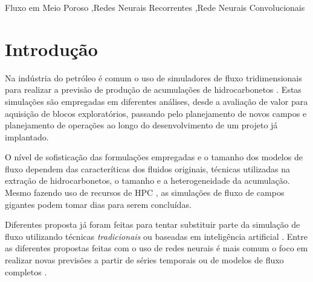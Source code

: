 \documentclass[final,5p]{elsarticle}
\numberwithin{equation}{section}
\begin{document}
\begin{frontmatter}

\begin{keyword}
    Fluxo em Meio Poroso \sep Redes Neurais Recorrentes \sep Rede Neurais Convolucionais



\end{keyword}

\end{frontmatter}

\section{Introdução}

    Na indústria do petróleo é comum o uso de simuladores de fluxo tridimensionais para realizar a previsão de produção de acumulações de hidrocarbonetos \cite{rosa2006engenharia,dake1983fundamentals}. Estas simulações são empregadas em diferentes análises, desde a avaliação de valor para aquisição de blocos exploratórios, passando pelo planejamento de novos campos e planejamento de operações ao longo do desenvolvimento de um projeto já implantado.

    O nível de sofisticação das formulações empregadas e o tamanho dos modelos de fluxo dependem das caracteríticas dos fluidos originais, técnicas utilizadas na extração de hidrocarbonetos, o tamanho e a heterogeneidade da acumulação. Mesmo fazendo uso de recursos de HPC \cite{10.2118/149132-MS}, as simulações de fluxo de campos gigantes podem tomar dias para serem concluídas.

    Diferentes proposta já foram feitas para tentar substituir parte da simulação de fluxo utilizando técnicas \emph{tradicionais} \cite{amorim2012risk} ou baseadas em inteligência artificial \cite{ertekin2019artificial}. Entre as diferentes propostas feitas com o uso de redes neurais é mais comum o foco em realizar novas previsões a partir de séries temporais \cite{de2022data, davtyan2020oil, kim2021recurrent} ou de modelos de fluxo completos \cite{cirac2023deep}.
\end{document}
